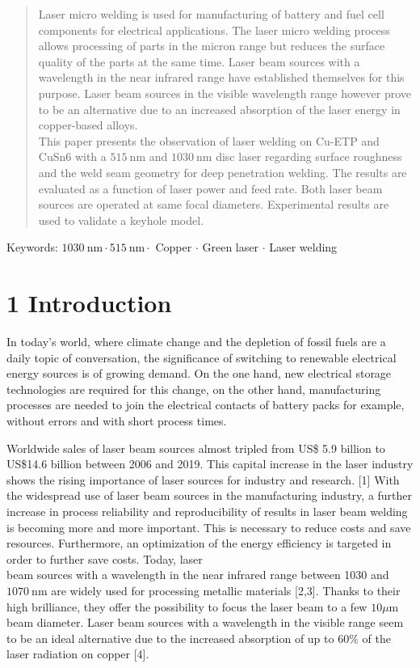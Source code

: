\documentclass[10pt]{article}
\begin{document}
\begin{abstract}
Laser micro welding is used for manufacturing of battery and fuel cell components for electrical applications. The laser micro welding process allows processing of parts in the micron range but reduces the surface quality of the parts at the same time. Laser beam sources with a wavelength in the near infrared range have established themselves for this purpose. Laser beam sources in the visible wavelength range however prove to be an alternative due to an increased absorption of the laser energy in copper-based alloys.\\
This paper presents the observation of laser welding on Cu-ETP and CuSn6 with a $515 \mathrm{~nm}$ and $1030 \mathrm{~nm}$ disc laser regarding surface roughness and the weld seam geometry for deep penetration welding. The results are evaluated as a function of laser power and feed rate. Both laser beam sources are operated at same focal diameters. Experimental results are used to validate a keyhole model.
\end{abstract}

Keywords: $1030 \mathrm{~nm} \cdot 515 \mathrm{~nm} \cdot$ Copper $\cdot$ Green laser $\cdot$ Laser welding

\section*{1 Introduction}
In today's world, where climate change and the depletion of fossil fuels are a daily topic of conversation, the significance of switching to renewable electrical energy sources is of growing demand. On the one hand, new electrical storage technologies are required for this change, on the other hand, manufacturing processes are needed to join the electrical contacts of battery packs for example, without errors and with short process times.

Worldwide sales of laser beam sources almost tripled from US\$ 5.9 billion to US\$14.6 billion between 2006 and 2019. This capital increase in the laser industry shows the rising importance of laser sources for industry and research. [1] With the widespread use of laser beam sources in the manufacturing industry, a further increase in process reliability and reproducibility of results in laser beam welding is becoming more and more important. This is necessary to reduce costs and save resources. Furthermore, an optimization of the energy efficiency is targeted in order to further save costs. Today, laser\\
beam sources with a wavelength in the near infrared range between 1030 and $1070 \mathrm{~nm}$ are widely used for processing metallic materials [2,3]. Thanks to their high brilliance, they offer the possibility to focus the laser beam to a few $10 \mu \mathrm{m}$ beam diameter. Laser beam sources with a wavelength in the visible range seem to be an ideal alternative due to the increased absorption of up to $60 \%$ of the laser radiation on copper [4].
\end{document}
